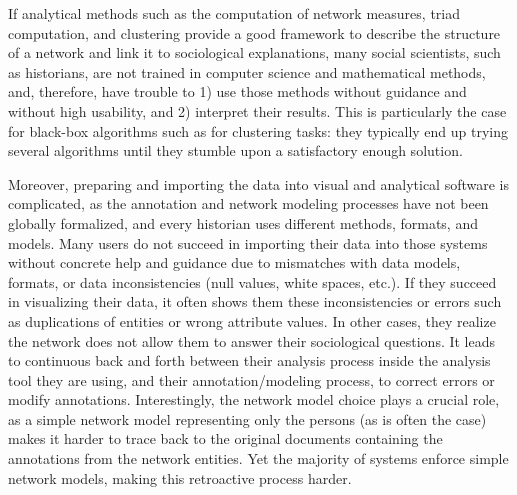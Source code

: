 If analytical methods such as the computation of network measures, triad computation, and clustering provide a good framework to describe the structure of a network and link it to sociological explanations\cite{wassermanSocialNetworkAnalysis1994, scottSocialNetworkAnalysis1988}, many social scientists, such as historians, are not trained in computer science and mathematical methods, and, therefore, have trouble to 1) use those methods without guidance and without high usability\cite{rollingerProlegomenaProblemsPerspectives2020, alkadi2022}, and 2) interpret their results.
This is particularly the case for black-box algorithms such as for clustering tasks: they typically end up trying several algorithms until they stumble upon a satisfactory enough solution\cite{pisterIntegratingPriorKnowledge2021}.



Moreover, preparing and importing the data into visual and analytical software is complicated, as the annotation and network modeling processes have not been globally formalized, and every historian uses different methods, formats, and models.
Many users do not succeed in importing their data into those systems without concrete help and guidance\cite{serranomolineroUnderstandingUseVistorian2017, alkadi2022} due to mismatches with data models, formats, or data inconsistencies (null values, white spaces, etc.).
If they succeed in visualizing their data, it often shows them these inconsistencies or errors such as duplications of entities or wrong attribute values.
In other cases, they realize the network does not allow them to answer their sociological questions\cite{lemercier12FormalNetwork2015}.
It leads to continuous back and forth between their analysis process inside the analysis tool they are using, and their annotation/modeling process, to correct errors or modify annotations.
Interestingly, the network model choice plays a crucial role, as a simple network model representing only the persons (as is often the case) makes it harder to trace back to the original documents containing the annotations from the network entities.
Yet the majority of \sna systems enforce simple network models, making this retroactive process harder.

